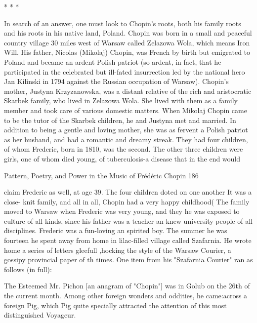                                               *    *     *

In search of an answer, one must look to Chopin's roots, both his family roots and his
roots in his native land, Poland. Chopin was born in a small and peaceful country village
30 miles west of Warsaw called Zelazowa Wola, which means Iron Will. His father,
Nicolas (Mikolaj) Chopin, was French by birth but emigrated to Poland and became an
ardent Polish patriot (so ardent, in fact, that he participated in the celebrated but ill-fated
insurrection led by the national hero Jan Kilinski in 1794 against the Russian occupation
of Warsaw). Chopin's mother, Justyna Krzyzanowska, was a distant relative of the rich
and aristocratic Skarbek family, who lived in Zelazowa Wola. She lived with them as a
family member and took care of various domestic matters. When Mikolaj Chopin came to
be the tutor of the Skarbek children, he and Justyna met and married. In addition to being
a gentle and loving mother, she was as fervent a Polish patriot as her husband, and had a
romantic and dreamy streak. They had four children, of whom Frederic, born in 1810,
was the second. The other three children were girls, one of whom died young, of
tuberculosis-a disease that in the end would




Pattern, Poetry, and Power in the Music of Frédéric Chopin                                  186

claim Frederic as well, at age 39. The four children doted on one another It was a close-
knit family, and all in all, Chopin had a very happy childhood(
    The family moved to Warsaw when Frederic was very young, and they he was
exposed to culture of all kinds, since his father was a teacher an knew university people
of all disciplines. Frederic was a fun-loving an spirited boy. The summer he was fourteen
he spent away from home in lilac-filled village called Szafarnia. He wrote home a series
of letters gleefull ,hocking the style of the Warsaw Courier, a gossipy provincial paper of
th times. One item from his "Szafarnia Courier" ran as follows (in full):

   The Esteemed Mr. Pichon [an anagram of "Chopin"] was in Golub on the 26th of
   the current month. Among other foreign wonders and oddities, he came:across a
   foreign Pig, which Pig quite specially attracted the attention of this most
   distinguished Voyageur.

